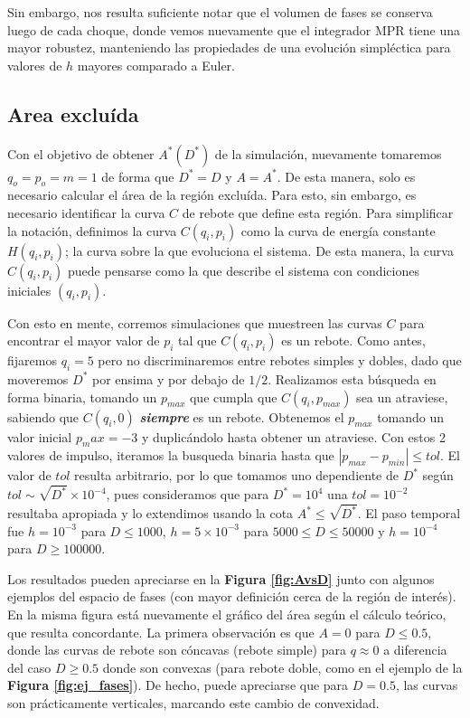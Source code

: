 Sin embargo, nos resulta suficiente notar que el volumen de fases se conserva luego de cada choque, donde vemos nuevamente que el integrador MPR tiene una mayor robustez, 
manteniendo las propiedades de una evolución simpléctica para valores de $h$ mayores comparado a Euler.


\subsection{Area excluída}{\label{sec:area_ex_comp}}

Con el objetivo de obtener $A^*(D^*)$ de la simulación, nuevamente tomaremos $q_o = p_o = m = 1$ de forma que $D^* = D$ y $A=A^*$.
De esta manera, solo es necesario calcular el área de la región excluída.
Para esto, sin embargo, es necesario identificar la curva $C$ de rebote que define esta región.
Para simplificar la notación, definimos la curva $C(q_i,p_i)$ como la curva de energía constante $H(q_i,p_i)$; la curva sobre la que evoluciona el sistema.
De esta manera, la curva $C(q_i,p_i)$ puede pensarse como la que describe el sistema con condiciones iniciales $(q_i,p_i)$.

Con esto en mente, corremos simulaciones que muestreen las curvas $C$ para encontrar el mayor valor de $p_i$ tal que $C(q_i, p_i)$ es un rebote.
Como antes, fijaremos $q_i=5$ pero no discriminaremos entre rebotes simples y dobles, dado que moveremos $D^*$ por ensima y por debajo de $1/2$.
Realizamos esta búsqueda en forma binaria, tomando un $p_{max}$ que cumpla que $C(q_i, p_{max})$ sea un atraviese, sabiendo que $C(q_i, 0)$ \textbf{\textit{siempre}} es un rebote.
Obtenemos el $p_{max}$ tomando un valor inicial $p_max = -3$ y duplicándolo hasta obtener un atraviese.
Con estos 2 valores de impulso, iteramos la busqueda binaria hasta que $|p_{max}-p_{min}|\leq tol$.
El valor de $tol$ resulta arbitrario, por lo que tomamos uno dependiente de $D^*$ según $tol \sim \sqrt{D^*}\times 10^{-4}$, pues consideramos que para $D^*=10^4$ 
una $tol = 10^{-2}$ resultaba apropiada y lo extendimos usando la cota $A^*\leq \sqrt{D^*}$.
El paso temporal fue $h=10^{-3}$ para $D\leq 1000$, $h=5\times10^{-3}$ para $5000\leq D\leq 50000$ y $h=10^{-4}$ para $D\geq 100000$.

Los resultados pueden apreciarse en la \textbf{Figura \ref{fig:AvsD}} junto con algunos ejemplos del espacio de fases (con mayor definición cerca de la región de interés).
En la misma figura está nuevamente el gráfico del área según el cálculo teórico, que resulta concordante.
La primera observación es que $A=0$ para $D\leq 0.5$, donde las curvas de rebote son cóncavas (rebote simple) para $q\approx 0$ a diferencia del caso $D\geq 0.5$ donde son convexas 
(para rebote doble, como en el ejemplo de la \textbf{Figura \ref{fig:ej_fases}}). 
De hecho, puede apreciarse que para $D=0.5$, las curvas son prácticamente verticales, marcando este cambio de convexidad.

